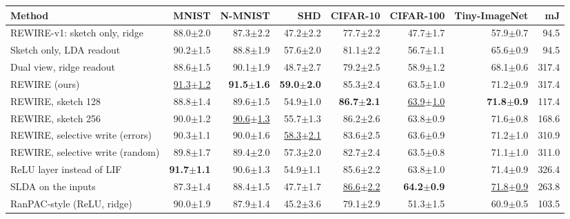 \begin{tabular}{lrrrrrrr}
\toprule
Method & MNIST & N-MNIST & SHD & CIFAR-10 & CIFAR-100 & Tiny-ImageNet & mJ \\
\midrule
REWIRE-v1: sketch only, ridge & 88.0{\tiny$\pm$2.0} & 87.3{\tiny$\pm$2.2} & 47.2{\tiny$\pm$2.2} & 77.7{\tiny$\pm$2.2} & 47.7{\tiny$\pm$1.7} & 57.9{\tiny$\pm$0.7} & 94.5 \\
Sketch only, LDA readout & 90.2{\tiny$\pm$1.5} & 88.8{\tiny$\pm$1.9} & 57.6{\tiny$\pm$2.0} & 81.1{\tiny$\pm$2.2} & 56.7{\tiny$\pm$1.1} & 65.6{\tiny$\pm$0.9} & 94.5 \\
Dual view, ridge readout & 88.6{\tiny$\pm$1.5} & 90.1{\tiny$\pm$1.9} & 48.7{\tiny$\pm$2.7} & 79.2{\tiny$\pm$2.5} & 58.9{\tiny$\pm$1.2} & 68.1{\tiny$\pm$0.6} & 317.4 \\
REWIRE (ours) & \underline{91.3{\tiny$\pm$1.2}} & \textbf{91.5{\tiny$\pm$1.6}} & \textbf{59.0{\tiny$\pm$2.0}} & 85.3{\tiny$\pm$2.4} & 63.5{\tiny$\pm$1.0} & 71.2{\tiny$\pm$0.9} & 317.4 \\
REWIRE, sketch 128 & 88.8{\tiny$\pm$1.4} & 89.6{\tiny$\pm$1.5} & 54.9{\tiny$\pm$1.0} & \textbf{86.7{\tiny$\pm$2.1}} & \underline{63.9{\tiny$\pm$1.0}} & \textbf{71.8{\tiny$\pm$0.9}} & 117.4 \\
REWIRE, sketch 256 & 90.0{\tiny$\pm$1.2} & \underline{90.6{\tiny$\pm$1.3}} & 55.7{\tiny$\pm$1.3} & 86.2{\tiny$\pm$2.6} & 63.8{\tiny$\pm$0.9} & 71.6{\tiny$\pm$0.8} & 168.6 \\
REWIRE, selective write (errors) & 90.3{\tiny$\pm$1.1} & 90.0{\tiny$\pm$1.6} & \underline{58.3{\tiny$\pm$2.1}} & 83.6{\tiny$\pm$2.5} & 63.6{\tiny$\pm$0.9} & 71.2{\tiny$\pm$1.0} & 310.9 \\
REWIRE, selective write (random) & 89.8{\tiny$\pm$1.7} & 89.4{\tiny$\pm$2.0} & 57.3{\tiny$\pm$2.0} & 82.7{\tiny$\pm$2.4} & 63.5{\tiny$\pm$0.8} & 71.1{\tiny$\pm$1.0} & 311.0 \\
ReLU layer instead of LIF & \textbf{91.7{\tiny$\pm$1.1}} & 90.6{\tiny$\pm$1.3} & 54.9{\tiny$\pm$1.1} & 85.6{\tiny$\pm$2.2} & 63.8{\tiny$\pm$1.0} & 71.4{\tiny$\pm$0.9} & 326.4 \\
SLDA on the inputs & 87.3{\tiny$\pm$1.4} & 88.4{\tiny$\pm$1.5} & 47.7{\tiny$\pm$1.7} & \underline{86.6{\tiny$\pm$2.2}} & \textbf{64.2{\tiny$\pm$0.9}} & \underline{71.8{\tiny$\pm$0.9}} & 263.8 \\
RanPAC-style (ReLU, ridge) & 90.0{\tiny$\pm$1.9} & 87.9{\tiny$\pm$1.4} & 45.2{\tiny$\pm$3.6} & 79.1{\tiny$\pm$2.9} & 51.3{\tiny$\pm$1.5} & 60.9{\tiny$\pm$0.5} & 103.5 \\
\bottomrule
\end{tabular}
